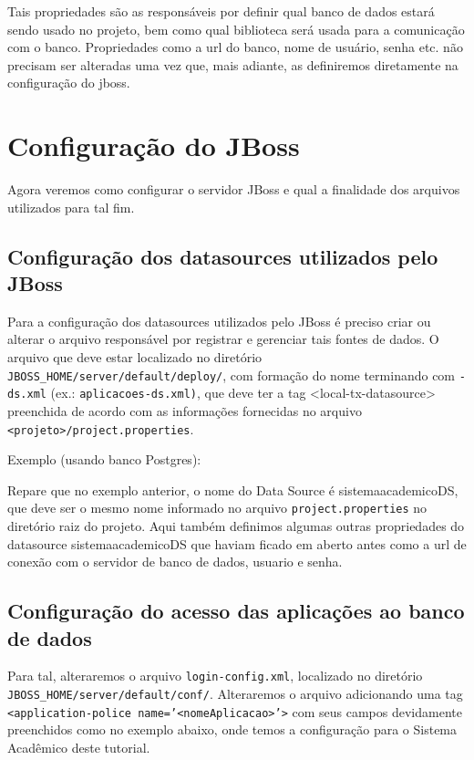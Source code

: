 Tais propriedades são as responsáveis por definir qual banco de dados estará
sendo usado no projeto, bem como qual biblioteca será usada para a comunicação
com o banco. Propriedades como a url do banco, nome de usuário, senha etc. não
precisam ser alteradas uma vez que, mais adiante, as definiremos diretamente na
configuração do jboss.

\section{Configuração do JBoss}
Agora veremos como configurar o servidor JBoss e qual a finalidade dos arquivos 
utilizados para tal fim. 

\subsection{Configuração dos datasources utilizados pelo JBoss}
Para a configuração dos datasources utilizados pelo JBoss é preciso criar ou
alterar o arquivo responsável por registrar e gerenciar tais fontes de dados.
O arquivo que deve estar localizado no diretório
\texttt{JBOSS\_HOME/server/default/deploy/}, com formação do nome terminando com
\texttt{-ds.xml} (ex.: \texttt{aplicacoes-ds.xml)}, que deve ter a tag
<local-tx-datasource> preenchida de acordo com as informações  fornecidas no
arquivo \texttt{<projeto>/project.properties}.

Exemplo (usando banco Postgres):

\begin{framed}
	
\end{framed}

Repare que no exemplo anterior, o nome do Data Source é sistemaacademicoDS, que
deve ser o mesmo nome informado no arquivo \texttt{project.properties} no
diretório raiz do projeto. Aqui também definimos algumas outras propriedades do
datasource sistemaacademicoDS que haviam ficado em aberto antes como a url de
conexão com o servidor de banco de dados, usuario e senha.

\subsection{Configuração do acesso das aplicações ao banco de dados}
Para tal, alteraremos o arquivo \texttt{login-config.xml}, localizado no
diretório \texttt{JBOSS\_HOME/server/default/conf/}. Alteraremos o arquivo
adicionando uma tag \texttt{<application-police name='<nomeAplicacao>'>} com
seus campos devidamente preenchidos como no exemplo abaixo, onde temos a
configuração para o Sistema Acadêmico deste tutorial.

